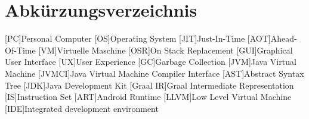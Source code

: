 \chapter*{Abkürzungsverzeichnis}
\begin{acronym}
    [PC]{Personal Computer}
    [OS]{Operating System}
    [JIT]{Just-In-Time}
    [AOT]{Ahead-Of-Time}
    [VM]{Virtuelle Maschine}
    [OSR]{On Stack Replacement}
    [GUI]{Graphical User Interface}
    [UX]{User Experience}
    [GC]{Garbage Collection}
    [JVM]{Java Virtual Machine}
    [JVMCI]{Java Virtual Machine Compiler Interface}    
    [AST]{Abstract Syntax Tree}
    [JDK]{Java Development Kit}
    [Graal IR]{Graal Intermediate Representation}
    [IS]{Instruction Set}
    [ART]{Android Runtime}
    [LLVM]{Low Level Virtual Machine}
    [IDE]{Integrated development environment}
\end{acronym}